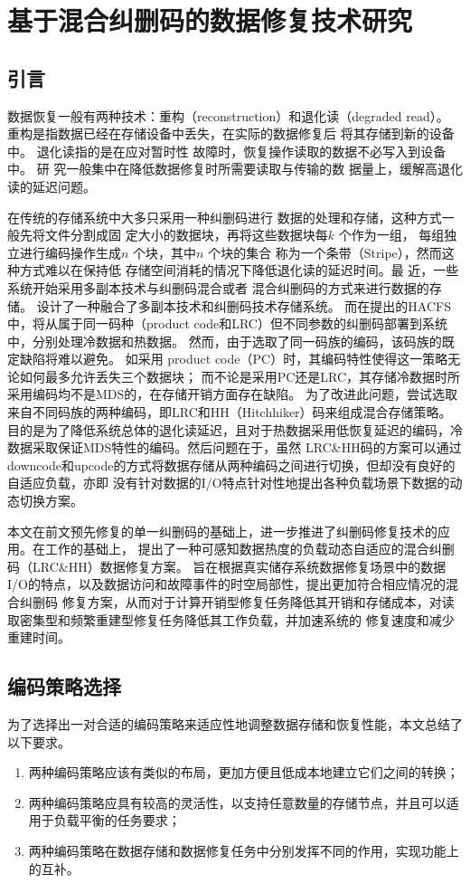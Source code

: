 \chapter{基于混合纠删码的数据修复技术研究}

\section{引言}
数据恢复一般有两种技术：重构（reconstruction）和退化读（degraded read）。
重构是指数据已经在存储设备中丢失，在实际的数据修复后
将其存储到新的设备中。 退化读指的是在应对暂时性
故障时，恢复操作读取的数据不必写入到设备中。 研
究一般集中在降低数据修复时所需要读取与传输的数
据量上，缓解高退化读的延迟问题。

在传统的存储系统中大多只采用一种纠删码进行
数据的处理和存储，这种方式一般先将文件分割成固
定大小的数据块，再将这些数据块每$k$
个作为一组，
每组独立进行编码操作生成$n$
个块，其中$n$
个块的集合
称为一个条带（Stripe），然而这种方式难以在保持低
存储空间消耗的情况下降低退化读的延迟时间。最
近，一些系统开始采用多副本技术与纠删码混合或者
混合纠删码的方式来进行数据的存储\cite{ma2013ensemble,friedman2014replicated,xia2015tale}。
\citet{friedman2014replicated,xia2015tale}设计了一种融合了多副本技术和纠删码技术存储系统。
而在\citet{xia2015tale}提出的HACFS中，将从属于同一码种（product code和LRC）但不同参数的纠删码部署到系统中，分别处理冷数据和热数据。
然而，由于选取了同一码族的编码，该码族的既定缺陷将难以避免。
如采用 product code（PC）时，其编码特性使得这一策略无论如何最多允许丢失三个数据块；
而不论是采用PC还是LRC，其存储冷数据时所采用编码均不是MDS的，在存储开销方面存在缺陷。
为了改进此问题，\citet{wang2020adaptive}尝试选取来自不同码族的两种编码，即LRC和HH（Hitchhiker）码来组成混合存储策略。
目的是为了降低系统总体的退化读延迟，且对于热数据采用低恢复延迟的编码，冷数据采取保证MDS特性的编码。然后问题在于，虽然
LRC\&HH码的方案可以通过downcode和upcode的方式将数据存储从两种编码之间进行切换，但却没有良好的自适应负载，亦即
没有针对数据的I/O特点针对性地提出各种负载场景下数据的动态切换方案。

本文在前文预先修复的单一纠删码的基础上，进一步推进了纠删码修复技术的应用。在\citet{wang2020adaptive}工作的基础上，
提出了一种可感知数据热度的负载动态自适应的混合纠删码（LRC\&HH）数据修复方案。
旨在根据真实储存系统数据修复场景中的数据I/O的特点，以及数据访问和故障事件的时空局部性，提出更加符合相应情况的混合纠删码
修复方案，从而对于计算开销型修复任务降低其开销和存储成本，对读取密集型和频繁重建型修复任务降低其工作负载，并加速系统的
修复速度和减少重建时间。

\section{编码策略选择}
为了选择出一对合适的编码策略来适应性地调整数据存储和恢复性能，本文总结了以下要求。
\begin{enumerate}
	\item 两种编码策略应该有类似的布局，更加方便且低成本地建立它们之间的转换；
	\item 两种编码策略应具有较高的灵活性，以支持任意数量的存储节点，并且可以适用于负载平衡的任务要求；
	\item 两种编码策略在数据存储和数据修复任务中分别发挥不同的作用，实现功能上的互补。
\end{enumerate}

